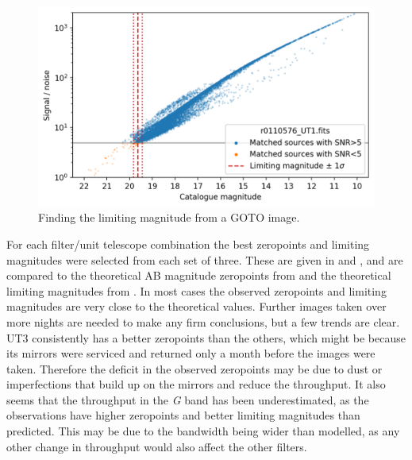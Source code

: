 \begin{colsection}
\begin{colsection}
\begin{figure}[t]
    \begin{center}
        \includegraphics[width=\textwidth]{images/throughput/limiting_mag_real.png}
    \end{center}
    \caption[Finding the limiting magnitude from a GOTO image]{
        Finding the limiting magnitude from a GOTO image.
    }\label{fig:lim_mag}
\end{figure}

For each filter/unit telescope combination the best zeropoints and limiting magnitudes were selected from each set of three. These are given in  and , and are compared to the theoretical AB magnitude zeropoints from  and the theoretical limiting magnitudes from . In most cases the observed zeropoints and limiting magnitudes are very close to the theoretical values. Further images taken over more nights are needed to make any firm conclusions, but a few trends are clear. UT3 consistently has a better zeropoints than the others, which might be because its mirrors were serviced and returned only a month before the images were taken. Therefore the deficit in the observed zeropoints may be due to dust or imperfections that build up on the mirrors and reduce the throughput. It also seems that the throughput in the \textit{G} band has been underestimated, as the observations have higher zeropoints and better limiting magnitudes than predicted. This may be due to the bandwidth being wider than modelled, as any other change in throughput would also affect the other filters.

\newpage


\end{colsection}
\end{colsection}

